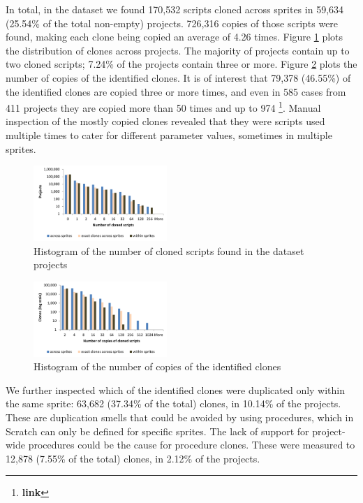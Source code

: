 \documentclass{sig-alternate}
\newcommand{\todo}[1]{\textbf{#1}}
\begin{document}
In total, in the dataset we found 170,532 scripts cloned across sprites in 59,634 (25.54\% of the total non-empty) projects. 726,316 copies of those scripts were found, making each clone being copied an average of 4.26 times. Figure \ref{fig:clonesprojects} plots the distribution of clones across projects. The majority of projects contain up to two cloned scripts; 7.24\% of the projects contain three or more. Figure \ref{fig:clonescopies} plots the number of copies of the identified clones. It is of interest that 79,378 (46.55\%) of the identified clones are copied three or more times, and even in 585 cases from 411 projects they are copied more than 50 times and up to 974 \footnote{\todo{link}}. Manual inspection of the mostly copied clones revealed that they were scripts used multiple times to cater for different parameter values, sometimes in multiple sprites.

\begin{figure}
	\centering
	\includegraphics[width=0.45\textwidth]{fig/charts/11clonesprojects}
	\caption{Histogram of the number of cloned scripts found in the dataset projects}
	\label{fig:clonesprojects}
\end{figure}

\begin{figure}
	\centering
	\includegraphics[width=0.45\textwidth]{fig/charts/11clonescopies}
	\caption{Histogram of the number of copies of the identified clones}
	\label{fig:clonescopies}
\end{figure}

We further inspected which of the identified clones were duplicated only within the same sprite: 63,682 (37.34\% of the total) clones, in 10.14\% of the projects. These are duplication smells that could be avoided by using procedures, which in Scratch can only be defined for specific sprites. The lack of support for project-wide procedures could be the cause for procedure clones. These were measured to 12,878 (7.55\% of the total) clones, in 2.12\% of the projects.
\end{document}
